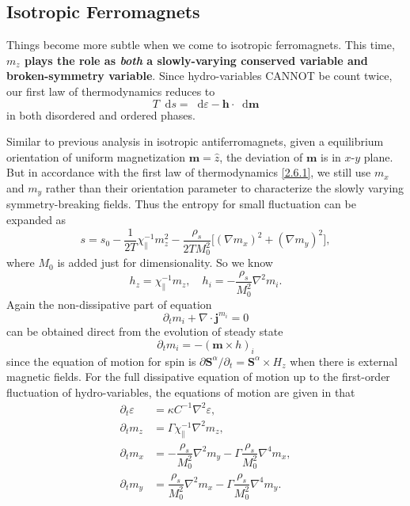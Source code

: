 \documentclass[10pt,nofootinbib,letterpaper]{revtex4}
\newcommand*\dd{\mathop{}\!\mathrm{d}}
\begin{document}
	\subsection{Isotropic Ferromagnets}
		Things become more subtle when we come to isotropic ferromagnets. This time, \textbf{$m_z$ plays the role as \emph{both} a slowly-varying conserved variable and broken-symmetry variable}. Since hydro-variables CANNOT be count twice, our first law of thermodynamics reduces to
		\begin{equation}\label{2.6.1}
			T\dd s=\dd \varepsilon-\bm{h}\cdot\dd\bm{m}
		\end{equation}
		in both disordered and ordered phases.\par
		Similar to previous analysis in isotropic antiferromagnets, given a equilibrium orientation of uniform magnetization $\bm{m}=\hat{z}$, the deviation of $\bm{m}$ is in $x$-$y$ plane. But in accordance with the first law of thermodynamics \eqref{2.6.1}, we still use $m_x$ and $m_y$ rather than their orientation parameter to characterize the slowly varying symmetry-breaking fields. Thus the entropy for small fluctuation can be expanded as
		\begin{equation}\label{2.6.2}
			s=s_0-\dfrac{1}{2T}\chi_\parallel^{-1}m_z^2-\dfrac{\rho_s}{2T M_0^2}\bigg[(\nabla m_x)^2+(\nabla m_y)^2\bigg],
		\end{equation}
		where $M_0$ is added just for dimensionality. So we know
		\begin{equation*}
			h_z=\chi_\parallel^{-1}m_z,\quad h_i=-\dfrac{\rho_s}{M_0^2}\nabla^2m_i.
		\end{equation*}
		Again the non-dissipative part of equation
		\begin{equation}\label{2.6.3}
			\partial_t m_i+\nabla\cdot\bm{j}^{m_i}=0
		\end{equation}
		can be obtained direct from the evolution of steady state 
		\begin{equation}\label{2.6.4}
			\partial_tm_i=-(\bm{m}\times h)_i
		\end{equation}
		since the equation of motion for spin is $\partial \bm{S}^\alpha/\partial_t=\bm{S}^\alpha\times H_z$ when there is external magnetic fields. For the full dissipative equation of motion up to the first-order fluctuation of hydro-variables, the equations of motion are given in \cite{chaikin2000principles} that
		\begin{align}
			\partial_t \varepsilon&=\kappa C^{-1}\nabla^2 \varepsilon,\label{2.6.5}\\
			\partial_t m_z&=\Gamma\chi_\parallel^{-1}\nabla^2 m_z,\label{2.6.6}\\
			\partial_t m_x&=-\dfrac{\rho_s}{M_0^2}\nabla^2 m_y-\Gamma\dfrac{\rho_s}{M_0^2}\nabla^4 m_x,\label{2.6.7}\\
			\partial_t m_y&=\dfrac{\rho_s}{M_0^2}\nabla^2 m_x-\Gamma\dfrac{\rho_s}{M_0^2}\nabla^4 m_y.\label{2.6.8}
		\end{align}
\end{document}
